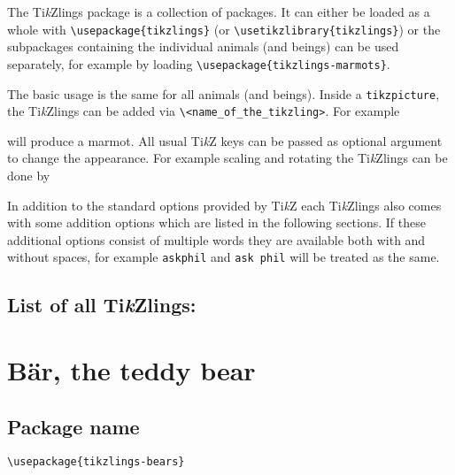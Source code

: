 \documentclass[parskip=half]{scrartcl}
\newcommand{\TikZ}{Ti\emph{k}Z\xspace}
\newcommand{\tikzlings}{Ti\emph{k}Zlings\xspace}
\begin{document}
The \tikzlings package is a collection of packages. It can either be loaded as a whole with \lstinline|\usepackage{tikzlings}| (or \lstinline|\usetikzlibrary{tikzlings}|) or the subpackages containing the individual animals (and beings) can be used separately, for example by loading \lstinline|\usepackage{tikzlings-marmots}|.

The basic usage is the same for all animals (and beings). Inside a \lstinline|tikzpicture|, the \tikzlings can be added via \color{SteelBlue!50!black}\lstinline|\<name_of_the_tikzling>|\color{black}. For example

\begin{tcblisting}{}
\marmot
\end{tcblisting}

will produce a marmot. All usual \TikZ keys can be passed as optional argument to change the appearance. For example scaling and rotating the \tikzlings can be done by

\begin{tcblisting}{}
\coati[rotate=30,scale=0.5]
\end{tcblisting}

In addition to the standard options provided by \TikZ each \tikzlings also comes with some addition options which are listed in the following sections. If these additional options consist of multiple words they are available both with and without spaces, for example \lstinline|askphil| and \lstinline|ask phil| will be treated as the same.

\subsection*{List of all \tikzlings:}

\begingroup
	\hypersetup{hidelinks}
	\tableofcontents
\endgroup


\clearpage
\section[Bear]{B\"ar, the teddy bear}

\subsection{Package name}

\begin{tcolorbox}[lower separated=false, lefthand width=.8\linewidth]
\vspace*{0.5cm}
\lstinline|\usepackage{tikzlings-bears}|
\vspace*{0.5cm}
\end{tcolorbox}
\end{document}
